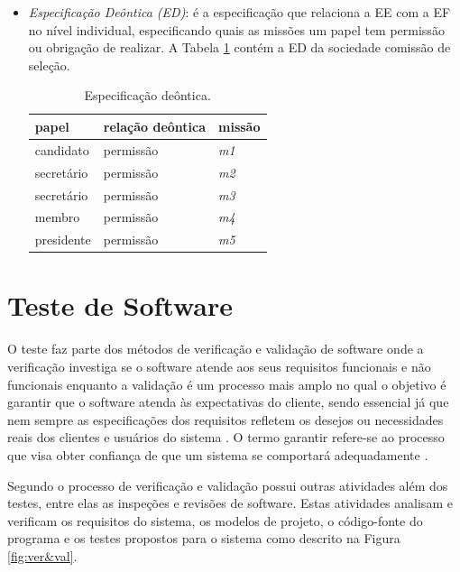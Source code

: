 \begin{itemize}
\item {\it Especificação Deôntica (ED)}: é a especificação que relaciona a EE com a EF no nível individual, especificando quais as missões um papel tem permissão ou obrigação de realizar. A Tabela \ref{tab:escola-deontica} contém a ED da sociedade comissão de seleção.

\begin{table}[ht]
\centering
\caption{Especificação deôntica. \cite{hubner2003modelo}}
\label{tab:escola-deontica}
\begin{tabular}{@{}lll@{}}
\toprule
papel       & relação deôntica  & missão                        \\ \midrule
candidato   & permissão         & \textit{m1}                          \\
secretário  & permissão         & \textit{m2}                          \\
secretário  & permissão         & \textit{m3}                          \\
membro      & permissão         & \textit{m4}                          \\
presidente  & permissão         & \textit{m5}                          \\
\bottomrule
\end{tabular}
\end{table}

\end{itemize}

\section{Teste de Software}

O teste faz parte dos métodos de verificação e validação de software onde a verificação investiga se o software atende aos seus requisitos funcionais e não funcionais enquanto a validação é um processo mais amplo no qual o objetivo é garantir que o software atenda às expectativas do cliente, sendo essencial já que nem sempre as especificações dos requisitos refletem os desejos ou necessidades reais dos clientes e usuários do sistema \cite{sommerville2010}. O termo garantir refere-se ao processo que visa obter confiança de que um sistema se comportará adequadamente \cite{winikoff2010assurance}. 

Segundo \citet{sommerville2010} o processo de verificação e validação possui outras atividades além dos testes, entre elas as inspeções e revisões de software. Estas atividades analisam e verificam os requisitos do sistema, os modelos de projeto, o código-fonte do programa e os testes propostos para o sistema como descrito na Figura \ref{fig:ver&val}. 

